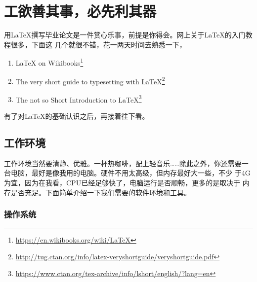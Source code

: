 \chapter{工欲善其事，必先利其器}
\label{cha:pre-requisite}

用\LaTeX{}撰写毕业论文是一件赏心乐事，前提是你得会。网上关于\LaTeX{}的入门教程很多，下面这
几个就很不错，花一两天时间去熟悉一下，

\begin{enumerate}
\item \LaTeX{} on Wikibooks\footnote{\url{https://en.wikibooks.org/wiki/LaTeX}}
\item The very short guide to typesetting with
  \LaTeX{}\footnote{\url{http://tug.ctan.org/info/latex-veryshortguide/veryshortguide.pdf}}
\item The not so Short Introduction to
  \LaTeX{}\footnote{\url{https://www.ctan.org/tex-archive/info/lshort/english/?lang=en}}
\end{enumerate}
有了对\LaTeX{}的基础认识之后，再接着往下看。

\section{工作环境}
\label{sec:env}

工作环境当然要清静、优雅。一杯热咖啡，配上轻音乐……除此之外，你还需要一
台电脑，最好是像我用的电脑。硬件不用太高级，但内存最好大一些，不少
于4G为宜，因为在我看，CPU已经足够快了，电脑运行是否顺畅，更多的是取决于
内存是否充足。下面简单介绍一下我们需要的软件环境和工具。

\subsection{操作系统}

